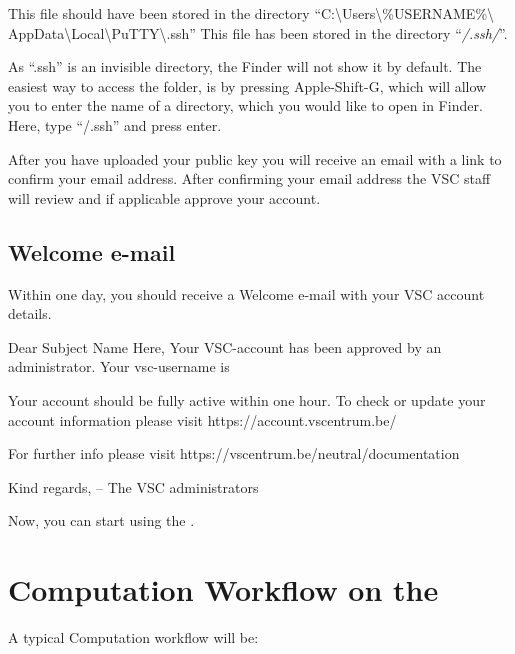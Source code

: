 \ifwindows
  This file should have been stored in the directory
  ``C:\textbackslash Users\textbackslash \%USERNAME\%\textbackslash
  AppData\textbackslash Local\textbackslash PuTTY\textbackslash .ssh''
\fi
\ifmacORlinux
  This file has been stored in the directory ``\emph{\tilde/.ssh/}''.
\fi

\ifmac
\begin{tip}
  As ``.ssh'' is an invisible directory, the Finder will
  not show it by default. The easiest way to access the folder, is by pressing
  Apple-Shift-G, which will allow you to enter the name of a directory, which
  you would like to open in Finder. Here, type ``\tilde/.ssh'' and press enter.
\end{tip}
\fi

After you have uploaded your public key you will receive an email with a link to
confirm your email address. After confirming your email address the VSC staff will
review and if applicable approve your account.

\subsection{Welcome e-mail}
\label{sec:welcome-email}

Within one day, you should receive a Welcome e-mail with your VSC account details.

\begin{flattext}
Dear Subject Name Here,
Your VSC-account has been approved by an administrator.
Your vsc-username is \userid

Your account should be fully active within one hour.
To check or update your account information please visit
https://account.vscentrum.be/

For further info please visit https://vscentrum.be/neutral/documentation

Kind regards,
-- The VSC administrators
\end{flattext}

Now, you can start using the \hpc.

\section{Computation Workflow on the \hpc}
\label{sec:compuation-workflow-on-the-hpc}

A typical Computation workflow will be:

